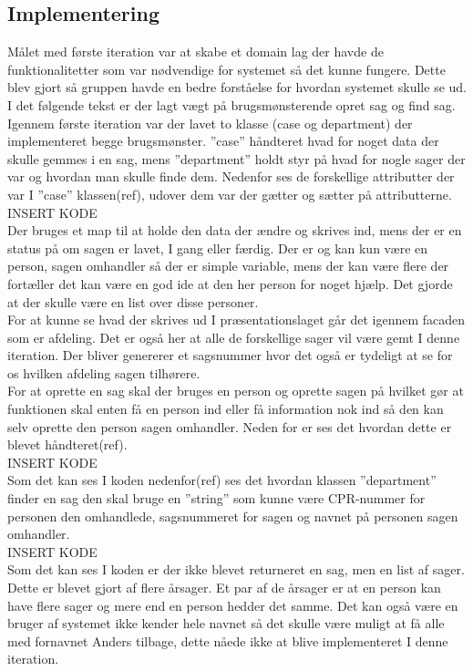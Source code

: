 \subsection{Implementering}
Målet med første iteration var at skabe et domain lag der havde de funktionalitetter som var nødvendige for systemet så det kunne fungere. Dette blev gjort så gruppen havde en bedre forståelse for hvordan systemet skulle se ud. I det følgende tekst er der lagt vægt på brugsmønsterende opret sag og find sag. Igennem første iteration var der lavet to klasse (case og department) der implementeret begge brugsmønster. ”case” håndteret hvad for noget data der skulle gemmes i en sag, mens ”department” holdt styr på hvad for nogle sager der var og hvordan man skulle finde dem.  Nedenfor ses de forskellige attributter der var I ”case” klassen(ref), udover dem var der gætter og sætter på attributterne. 
\\INSERT KODE\\
Der bruges et map til at holde den data der ændre og skrives ind, mens der er en status på om sagen er lavet, I gang eller færdig. Der er og kan kun være en person, sagen omhandler så der er simple variable, mens der kan være flere der fortæller det kan være en god ide at den her person for noget hjælp. Det gjorde at der skulle være en list over disse personer. \\
For at kunne se hvad der skrives ud I præsentationslaget går det igennem facaden som er afdeling. Det er også her at alle de forskellige sager vil være gemt I denne iteration. Der bliver genererer et sagsnummer hvor det også er tydeligt at se for os hvilken afdeling sagen tilhørere. \\ 
For at oprette en sag skal der bruges en person og oprette sagen på hvilket gør at funktionen skal enten få en person ind eller få information nok ind så den kan selv oprette den person sagen omhandler. Neden for er ses det hvordan dette er blevet håndteret(ref). 
\\INSERT KODE\\
Som det kan ses I koden nedenfor(ref) ses det hvordan klassen ”department” finder en sag den skal bruge en ”string” som kunne være CPR-nummer for personen den omhandlede, sagsnummeret for sagen og navnet på personen sagen omhandler. 
\\INSERT KODE\\
Som det kan ses I koden er der ikke blevet returneret en sag, men en list af sager. Dette er blevet gjort af flere årsager. Et par af de årsager er at en person kan have flere sager og mere end en person hedder det samme. Det kan også være en bruger af systemet ikke kender hele navnet så det skulle være muligt at få alle med fornavnet Anders tilbage, dette nåede ikke at blive implementeret I denne iteration. 

